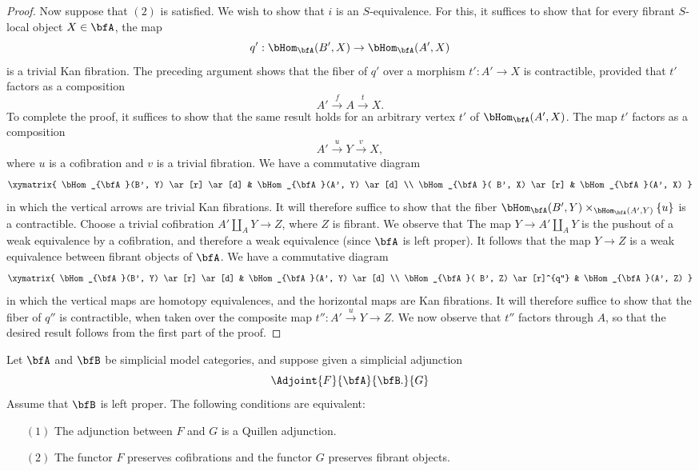 \begin{Simplicial Categories}
\begin{proof}
Now suppose that $(2)$ is satisfied. We wish to show that $i$ is an $S$-equivalence. For this, it suffices to show that for every fibrant $S$-local object $X \in \bfA$, the map
$$ q': \bHom_{\bfA}( B', X) \rightarrow \bHom_{\bfA}(A',X)$$ is a trivial Kan fibration.
The preceding argument shows that the fiber of $q'$ over a morphism $t': A' \rightarrow X$ is contractible, provided that $t'$ factors as a composition
$$ A' \stackrel{f}{\rightarrow} A \stackrel{t}{\rightarrow} X.$$
To complete the proof, it suffices to show that the same result holds for an arbitrary vertex
$t'$ of $\bHom_{\bfA}(A', X)$. The map $t'$ factors as a composition
$$ A' \stackrel{u}{\rightarrow} Y \stackrel{v}{\rightarrow} X,$$
where $u$ is a cofibration and $v$ is a trivial fibration. We have a commutative diagram
$$ \xymatrix{ \bHom_{\bfA}(B', Y) \ar[r] \ar[d] & \bHom_{\bfA}(A', Y) \ar[d] \\
\bHom_{\bfA}( B', X) \ar[r] & \bHom_{\bfA}(A', X) }$$
in which the vertical arrows are trivial Kan fibrations. It will therefore suffice to show that the fiber 
$\bHom_{\bfA}(B', Y) \times_{ \bHom_{\bfA}(A',Y) } \{ u \}$ is a contractible.
Choose a trivial cofibration $A' \coprod_{A} Y \rightarrow Z$, where $Z$ is fibrant. We observe that
The map $Y \rightarrow A' \coprod_{A} Y$ is the pushout of a weak equivalence by a cofibration, and therefore a weak equivalence (since $\bfA$ is left proper). It follows that the map
$Y \rightarrow Z$ is a weak equivalence between fibrant objects of $\bfA$. We have a commutative diagram 
$$ \xymatrix{ \bHom_{\bfA}(B', Y) \ar[r] \ar[d] & \bHom_{\bfA}(A', Y) \ar[d] \\
\bHom_{\bfA}( B', Z) \ar[r]^{q''} & \bHom_{\bfA}(A', Z) }$$
in which the vertical maps are homotopy equivalences, and the horizontal maps are Kan fibrations. It will therefore suffice to show that the fiber of $q''$ is contractible, when taken over the composite map $t'': A' \stackrel{u}{\rightarrow} Y \rightarrow Z$. We now observe that $t''$ factors through
$A$, so that the desired result follows from the first part of the proof.
\end{proof}

\begin{corollary}\label{swask}
Let $\bfA$ and $\bfB$ be simplicial model categories, and suppose given a simplicial adjunction
$$ \Adjoint{F}{\bfA}{\bfB.}{G}$$
Assume that $\bfB$ is left proper. The following conditions are equivalent:
\begin{itemize}
\item[$(1)$] The adjunction between $F$ and $G$ is a Quillen adjunction.
\item[$(2)$] The functor $F$ preserves cofibrations and the functor $G$ preserves fibrant objects.
\end{itemize}
\end{corollary}


\end{Simplicial Categories}
